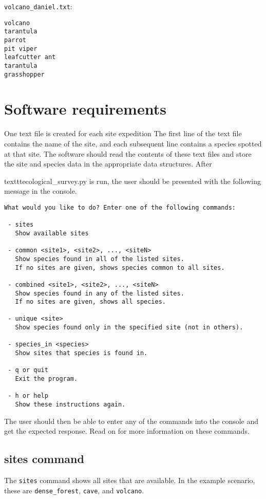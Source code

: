 \documentclass[12pt,letterpaper]{article}
\begin{document}
\vspace{2mm}
\texttt{volcano\_daniel.txt}:
\begin{lstlisting}
volcano
tarantula
parrot
pit viper
leafcutter ant
tarantula
grasshopper
\end{lstlisting}


\section{Software requirements}
One text file is created for each site expedition The first line of the text file contains the name of the site, and each subsequent line contains a species spotted at that site. The software should read the contents of these text files and store the site and species data in the appropriate data structures. After \usepackage{}texttt{ecological\_survey.py} is run, the user should be presented with the following message in the console.

\begin{lstlisting}
What would you like to do? Enter one of the following commands:

 - sites
   Show available sites

 - common <site1>, <site2>, ..., <siteN>  
   Show species found in all of the listed sites.  
   If no sites are given, shows species common to all sites.

 - combined <site1>, <site2>, ..., <siteN>  
   Show species found in any of the listed sites.  
   If no sites are given, shows all species.

 - unique <site>  
   Show species found only in the specified site (not in others).

 - species_in <species>
   Show sites that species is found in.

 - q or quit  
   Exit the program.

 - h or help  
   Show these instructions again.

\end{lstlisting}

The user should then be able to enter any of the commands into the console and get the expected response. Read on for more information on these commands.

\subsection{sites command}
The \texttt{sites} command shows all sites that are available. In the example scenario, these are \texttt{dense\_forest}, \texttt{cave}, and \texttt{volcano}.
\end{document}
